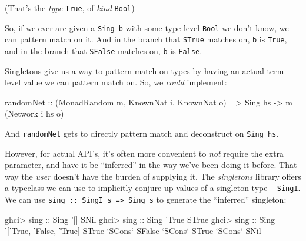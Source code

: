 \documentclass[]{article}
\newenvironment{Shaded}{\begin{snugshade}}{\end{snugshade}}
\newcommand{\CharTok}[1]{\textcolor[rgb]{0.31,0.60,0.02}{#1}}
\newcommand{\DataTypeTok}[1]{\textcolor[rgb]{0.13,0.29,0.53}{#1}}
\newcommand{\FunctionTok}[1]{\textcolor[rgb]{0.00,0.00,0.00}{#1}}
\newcommand{\NormalTok}[1]{#1}
\newcommand{\OtherTok}[1]{\textcolor[rgb]{0.56,0.35,0.01}{#1}}
\begin{document}
(That's the \emph{type} \texttt{\textquotesingle{}True}, of \emph{kind}
\texttt{Bool})

So, if we ever are given a \texttt{Sing\ b} with some type-level \texttt{Bool}
we don't know, we can pattern match on it. And in the branch that \texttt{STrue}
matches on, \texttt{b} is \texttt{\textquotesingle{}True}, and in the branch
that \texttt{SFalse} matches on, \texttt{b} is \texttt{False}.

Singletons give us a way to pattern match on types by having an actual
term-level value we can pattern match on. So, we \emph{could} implement:

\begin{Shaded}
\begin{Highlighting}[]
\OtherTok{randomNet ::}\NormalTok{ (}\DataTypeTok{MonadRandom}\NormalTok{ m, }\DataTypeTok{KnownNat}\NormalTok{ i, }\DataTypeTok{KnownNat}\NormalTok{ o)}
          \OtherTok{=>} \DataTypeTok{Sing}\NormalTok{ hs }\OtherTok{->}\NormalTok{ m (}\DataTypeTok{Network}\NormalTok{ i hs o)}
\end{Highlighting}
\end{Shaded}

And \texttt{randomNet} gets to directly pattern match and deconstruct on
\texttt{Sing\ hs}.

However, for actual API's, it's often more convenient to \emph{not} require the
extra parameter, and have it be ``inferred'' in the way we've been doing it
before. That way the \emph{user} doesn't have the burden of supplying it. The
\emph{singletons} library offers a typeclass we can use to implicitly conjure up
values of a singleton type -- \texttt{SingI}. We can use
\texttt{sing\ ::\ SingI\ s\ =\textgreater{}\ Sing\ s} to generate the
``inferred'' singleton:

\begin{Shaded}
\begin{Highlighting}[]
\NormalTok{ghci}\FunctionTok{>}\OtherTok{ sing ::} \DataTypeTok{Sing} \CharTok{'[]}
\DataTypeTok{SNil}
\NormalTok{ghci}\FunctionTok{>}\OtherTok{ sing ::} \DataTypeTok{Sing} \CharTok{'True}
\DataTypeTok{STrue}
\NormalTok{ghci}\FunctionTok{>}\OtherTok{ sing ::} \DataTypeTok{Sing} \CharTok{'['}\DataTypeTok{True}\NormalTok{, }\CharTok{'False, '}\DataTypeTok{True}\NormalTok{]}
\DataTypeTok{STrue} \OtherTok{`SCons`} \DataTypeTok{SFalse} \OtherTok{`SCons`} \DataTypeTok{STrue} \OtherTok{`SCons`} \DataTypeTok{SNil}
\end{Highlighting}
\end{Shaded}
\end{document}

